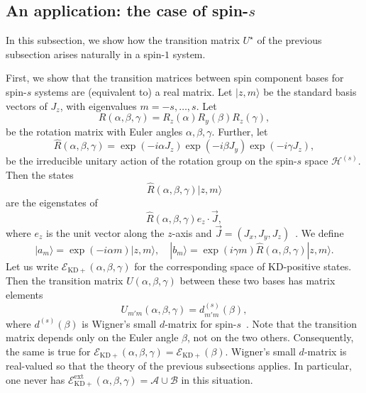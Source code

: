 \documentclass[a4paper, notitlepage, 11pt]{article}
\numberwithin{equation}{section}
\newcommand{\red}[1]{\textcolor{red}{#1}}
\newcommand{\Acal}{{\mathcal A}}
\newcommand{\Bcal}{{\mathcal B}}
\newcommand{\EcalKDC}{{\mathcal E}_{\mathrm{KD+}}}
\newcommand{\EcalKDCext}{{\mathcal E}_{\mathrm{KD+}}^{\mathrm{ext}}}
\begin{document}
\subsection{An application: the case of spin-$s$}\label{s:spin1}
In this subsection, we show how the transition matrix $U^\star$ of the previous subsection arises naturally in a spin-$1$ system. 

First, we show that the transition matrices between spin component bases for spin-$s$ systems are (equivalent to) a real matrix.  Let 
$|z,m\rangle$
be the standard basis vectors of $J_z$, with eigenvalues $m=-s, \dots, s$. Let 
$$
R(\alpha,\beta,\gamma)=R_z(\alpha)R_y(\beta)R_z(\gamma) ,
$$
be the rotation matrix with Euler angles $\alpha,\beta,\gamma$. Further,  let 
$$
\hat R(\alpha, \beta,\gamma)=\exp(-i\alpha J_z)\exp(-i\beta J_y)\exp(-i\gamma J_z) ,
$$
be the irreducible unitary action of the rotation group on the spin-$s$ space $\mathcal H^{(s)}$. Then the states 
$$
\hat R(\alpha, \beta,\gamma)|z, m\rangle
$$
are the eigenstates of 
$$
\hat R(\alpha, \beta,\gamma)e_z\cdot \vec J,
$$
where $e_z$ is the unit vector along the $z$-axis and $\vec J=(J_x, J_y, J_z)$~\cite{SA94}. 
We define
\begin{equation}\label{eq:ABbasis}
|a_m\rangle=\exp(-i\alpha m)|z,m\rangle,\quad |b_m\rangle=\exp(i\gamma m)\hat R(\alpha, \beta,\gamma)|z, m\rangle.
\end{equation}
Let us write $\EcalKDC(\alpha,\beta,\gamma)$ for the corresponding space of KD-positive states. Then the transition matrix $U(\alpha,\beta,\gamma)$ between these two bases has matrix elements
$$
U_{m'm}(\alpha,\beta,\gamma)=d^{(s)}_{m'm}(\beta),
$$
where $d^{(s)}(\beta)$ is Wigner's small $d$-matrix for spin-$s$~\cite{SA94}.  Note that the transition matrix depends only on the Euler angle $\beta$, not on the two others. Consequently, the same is true for $\EcalKDC(\alpha,\beta,\gamma)=\EcalKDC(\beta)$. 
Wigner's small $d$-matrix is real-valued so that the theory of the previous subsections applies. In particular, one never has $\EcalKDCext(\alpha,\beta,\gamma)=\Acal\cup\Bcal$ in this situation.
\end{document}
